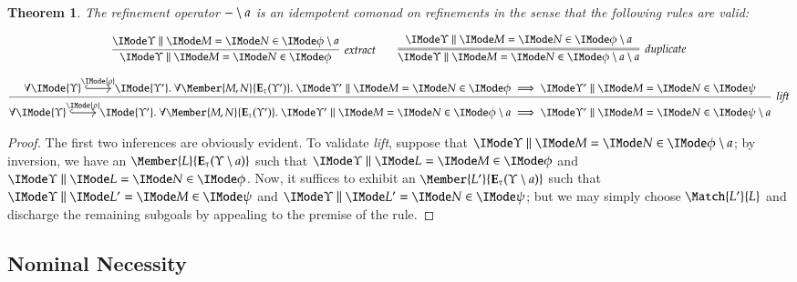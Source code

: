 \documentclass[11pt]{article}
\newtheorem{thm}{Theorem}[section]
\theoremstyle{definition}
\theoremstyle{notation}
\theoremstyle{remark}
\numberwithin{equation}{section}
\newcommand\Exprs{\mathbf{E}}
\begin{document}
\begin{thm} \label{thm:independence-comonadic}
  The refinement operator $-\setminus a$ is an idempotent comonad on refinements
  in the sense that the following rules are valid:

  \begin{gather*}
    \infer[\textit{extract}]{
      \RMemEq{\Upsilon}{M}{N}{\phi}
    }{
      \RMemEq{\Upsilon}{M}{N}{\Indep{\phi}{a}}
    }
    \qquad
    \infer=[\textit{duplicate}]{
      \RMemEq{\Upsilon}{M}{N}{\Indep{\Indep{\phi}{a}}{a}}
    }{
      \RMemEq{\Upsilon}{M}{N}{\Indep{\phi}{a}}
    }
    \\[6pt]
    \infer[\textit{lift}]{
      \forall
        \begin{tikzcd}[cramped, ampersand replacement = \&]
          \IMode{\Upsilon} \arrow[r,hook,"\IMode{\rho}"] \&\IMode{\Upsilon'}
        \end{tikzcd}.\
      \forall\Member{M,N}{\Exprs_\tau(\Upsilon')}.\
      \RMemEq{\Upsilon'}{M}{N}{\Indep{\phi}{a}}
      \implies
      \RMemEq{\Upsilon'}{M}{N}{\Indep{\psi}{a}}
    }{
      \forall
        \begin{tikzcd}[cramped, ampersand replacement = \&]
          \IMode{\Upsilon} \arrow[r,hook,"\IMode{\rho}"] \&\IMode{\Upsilon'}
        \end{tikzcd}.\
      \forall\Member{M,N}{\Exprs_\tau(\Upsilon')}.\
      \RMemEq{\Upsilon'}{M}{N}{\phi}
      \implies
      \RMemEq{\Upsilon'}{M}{N}{\psi}
    }
  \end{gather*}
\end{thm}
\begin{proof}
  The first two inferences are obviously evident. To validate \textit{lift},
  suppose that $\RMemEq{\Upsilon}{M}{N}{\Indep{\phi}{a}}$; by inversion, we
  have an $\Member{L}{\Exprs_\tau(\Upsilon\setminus a)}$ such that
  $\RMemEq{\Upsilon}{L}{M}{\phi}$ and $\RMemEq{\Upsilon}{L}{N}{\phi}$.  Now, it
  suffices to exhibit an $\Member{L'}{\Exprs_\tau(\Upsilon\setminus a)}$ such
  that $\RMemEq{\Upsilon}{L'}{M}{\psi}$ and $\RMemEq{\Upsilon}{L'}{N}{\psi}$;
  but we may simply choose $\Match{L'}{L}$ and discharge the remaining subgoals
  by appealing to the premise of the rule.
\end{proof}

\subsection{Nominal Necessity}
\end{document}
